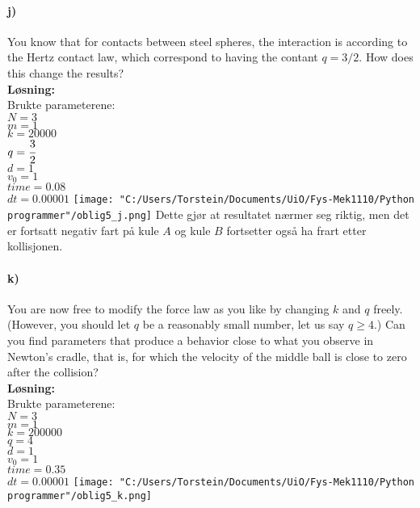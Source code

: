 \documentclass[11pt, A4paper,norsk]{article}
\begin{document}
		\paragraph{j)}
			\begin{flushleft}
You know that for contacts between steel spheres, the interaction is according to the Hertz contact law, which correspond to having the contant $q = 3/2$. How does this change the results? \\
\vspace{1mm}
\textbf{Løsning:} \\
\vspace{1mm}
Brukte parameterene: \\
$N = 3$ \\
$m = 1$ \\
$k = 20000$ \\
$q = \cfrac{3}{2}$ \\
$d = 1$ \\
$v_0 = 1$ \\
$time = 0.08$ \\
$dt = 0.00001$
\texttt{[image: "C:/Users/Torstein/Documents/UiO/Fys-Mek1110/Python programmer"/oblig5\_j.png]}
Dette gjør at resultatet nærmer seg riktig, men det er fortsatt negativ fart på kule $A$ og kule $B$ fortsetter også ha frart etter kollisjonen.
			\end{flushleft}









		\paragraph{k)}
			\begin{flushleft}
You are now free to modify the force law as you like by changing $k$ and $q$ freely. (However, you should let $q$ be a reasonably small number, let us say $q \geq 4$.) Can you find parameters that produce a behavior close to what you observe in Newton’s cradle, that is, for which the velocity of the middle ball is close to zero after the collision? \\
\vspace{1mm}
\textbf{Løsning:} \\
\vspace{1mm}
Brukte parameterene: \\
$N = 3$ \\
$m = 1$ \\
$k = 200000$ \\
$q = 4$ \\
$d = 1$ \\
$v_0 = 1$ \\
$time = 0.35$ \\
$dt = 0.00001$
\texttt{[image: "C:/Users/Torstein/Documents/UiO/Fys-Mek1110/Python programmer"/oblig5\_k.png]}
			\end{flushleft}
\end{document}
